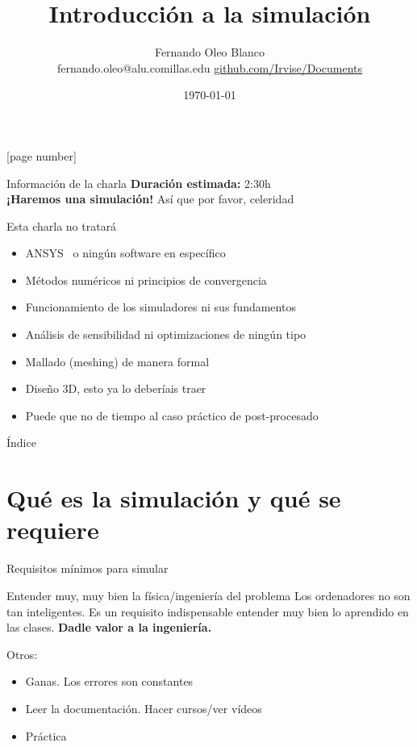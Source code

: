 \documentclass[12pt]{beamer}
\begin{document}
	\author{Fernando Oleo Blanco \\ fernando.oleo@alu.comillas.edu \hfill 	\href{https://github.com/Irvise/Documents}{github.com/Irvise/Documents}}
	\title{Introducción a la simulación}
	\date{\today}
	[page number]
\begin{frame}[plain]
	\maketitle
\end{frame}

\begin{frame}{Información de la charla}
	\textbf{Duración estimada:} 2:30h \\
	\textbf{¡Haremos una simulación!} Así que por favor, celeridad
	
	\begin{block}{Esta charla no tratará}
		\begin{itemize}
			\item ANSYS \textregistered\ o ningún software en específico
			\item Métodos numéricos ni principios de convergencia
			\item Funcionamiento de los simuladores ni sus fundamentos
			\item Análisis de sensibilidad ni optimizaciones de ningún tipo
			\item Mallado (meshing) de manera formal
			\item Diseño 3D, esto ya lo deberíais traer
			\item Puede que no de tiempo al caso práctico de post-procesado
		\end{itemize}
	\end{block}
\end{frame}

\begin{frame}{Índice}
	\setcounter{tocdepth}{2}
	\tableofcontents
\end{frame}

\section{Qué es la simulación y qué se requiere}

\begin{frame}{Requisitos mínimos para simular}
	\begin{block}{Entender muy, muy bien la física/ingeniería del problema}
		Los ordenadores no son tan inteligentes. Es un requisito indispensable entender muy bien lo aprendido en las clases. \textbf{Dadle valor a la ingeniería.}
	\end{block}
	Otros:
	\begin{itemize}
		\item Ganas. Los errores son constantes
		\item Leer la documentación. Hacer cursos/ver vídeos
		\item Práctica
	\end{itemize}
\end{frame}
\end{document}
